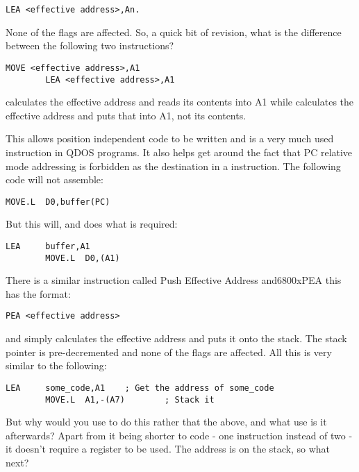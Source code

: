 \begin{lstlisting}[firstnumber=1,]
        LEA <effective address>,An.
\end{lstlisting}

None of the flags are affected. So, a quick bit of revision, what
      is the difference between the following two instructions?

\begin{lstlisting}[firstnumber=1,]
        MOVE <effective address>,A1
        LEA <effective address>,A1
\end{lstlisting}

 calculates the effective address and reads its contents into
      A1 while  calculates the effective address and puts that into A1, not
      its contents.

This allows position independent code to be written and is a very
      much used instruction in QDOS programs. It also helps get around the
      fact that PC relative mode addressing is forbidden as the destination in
      a  instruction. The following code will not assemble:

\begin{lstlisting}[firstnumber=1,]
        MOVE.L  D0,buffer(PC)
\end{lstlisting}

But this will, and does what is required:

\begin{lstlisting}[firstnumber=1,]
        LEA     buffer,A1
        MOVE.L  D0,(A1)
\end{lstlisting}

There is a similar instruction called Push Effective Address and\mc6800x{PEA}
      this has the format:

\begin{lstlisting}[firstnumber=1,]
        PEA <effective address>
\end{lstlisting}

and simply calculates the effective address and puts it onto the
      stack. The stack pointer is pre-decremented and none of the flags are
      affected. All this is very similar to the following:

\begin{lstlisting}[firstnumber=1,]
        LEA     some_code,A1    ; Get the address of some_code
        MOVE.L  A1,-(A7)        ; Stack it
\end{lstlisting}

But why would you use  to do this rather that the above, and
      what use is it afterwards? Apart from it being shorter to code -{} one
      instruction instead of two -{} it doesn't require a register to be used.
      The address is on the stack, so what next?

